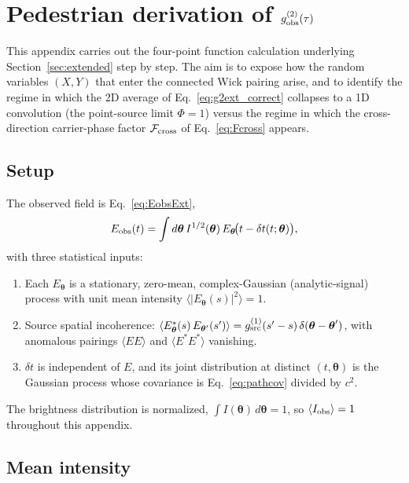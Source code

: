 \documentclass[aps,prd,onecolumn,amsmath,amssymb]{revtex4-2}
\begin{document}
\appendix

\section{Pedestrian derivation of $g^{(2)}_{\rm obs}(\tau)$}
\label{app:g2ext}

This appendix carries out the four-point function calculation underlying
Section~\ref{sec:extended} step by step.  The aim is to expose how the
random variables $(X,Y)$ that enter the connected Wick pairing arise, and
to identify the regime in which the 2D average of Eq.~\eqref{eq:g2ext_correct}
collapses to a 1D convolution (the point-source limit $\Phi=1$) versus
the regime in which the cross-direction carrier-phase factor
$\mathcal{F}_{\rm cross}$ of Eq.~\eqref{eq:Fcross} appears.

\subsection{Setup}

The observed field is Eq.~\eqref{eq:EobsExt},
\begin{equation}
  E_{\rm obs}(t) = \int d\boldsymbol{\theta}\, I^{1/2}(\boldsymbol{\theta})\,
    E_{\boldsymbol{\theta}}\!\big(t - \delta t(t;\boldsymbol{\theta})\big),
  \label{eq:Eobs_app}
\end{equation}
with three statistical inputs:
\begin{enumerate}
  \item Each $E_{\boldsymbol{\theta}}$ is a stationary, zero-mean,
    complex-Gaussian (analytic-signal) process with unit mean intensity
    $\langle |E_{\boldsymbol{\theta}}(s)|^2 \rangle = 1$.
  \item Source spatial incoherence:
    $\langle E^*_{\boldsymbol{\theta}}(s)\,E_{\boldsymbol{\theta}'}(s')\rangle
    = g^{(1)}_{\rm src}(s'-s)\,\delta(\boldsymbol{\theta}-\boldsymbol{\theta}')$,
    with anomalous pairings $\langle EE\rangle$ and $\langle E^*E^*\rangle$
    vanishing.
  \item $\delta t$ is independent of $E$, and its joint distribution at
    distinct $(t,\boldsymbol{\theta})$ is the Gaussian process whose
    covariance is Eq.~\eqref{eq:pathcov} divided by $c^2$.
\end{enumerate}
The brightness distribution is normalized,
$\int I(\boldsymbol{\theta})\,d\boldsymbol{\theta} = 1$, so
$\langle I_{\rm obs}\rangle = 1$ throughout this appendix.

\subsection{Mean intensity}
\end{document}
